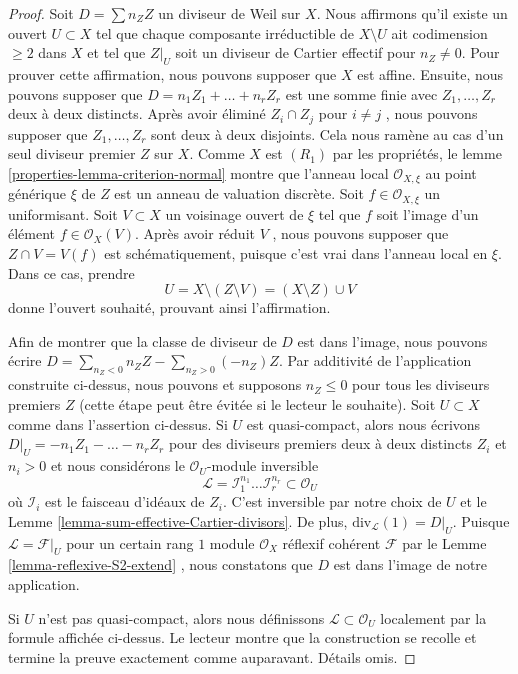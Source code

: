 \begin{proof}
\medskip\noindent
Soit  $D = \sum n_Z Z$  un diviseur de Weil sur  $X$. Nous affirmons qu'il
existe un ouvert  $U \subset X$  tel que chaque composante irréductible de
 $X \setminus U$  ait codimension  $\geq 2$  dans  $X$  et tel que
 $Z|_U$  soit un diviseur de Cartier effectif pour  $n_Z \not = 0$. Pour prouver
cette affirmation, nous pouvons supposer que  $X$  est affine. Ensuite,
nous pouvons supposer que  $D = n_1 Z_1 + \ldots + n_r Z_r$  est une somme finie avec  $Z_1, \ldots, Z_r$  deux
à deux distincts. Après avoir éliminé  $Z_i \cap Z_j$  pour  $i \not = j$ , nous pouvons
supposer que  $Z_1, \ldots, Z_r$  sont deux à deux disjoints. Cela nous ramène au cas d'un
seul diviseur premier  $Z$  sur  $X$. Comme  $X$  est
 $(R_1)$  par les propriétés, le lemme  \ref{properties-lemma-criterion-normal}  montre que l'anneau local
 $\mathcal{O}_{X, \xi}$  au point générique  $\xi$  de  $Z$  est un anneau de
valuation discrète. Soit  $f \in \mathcal{O}_{X, \xi}$  un uniformisant. Soit  $V \subset X$  un
voisinage ouvert de  $\xi$  tel que  $f$  soit l'image d'un élément
 $f \in \mathcal{O}_X(V)$. Après avoir réduit  $V$ , nous pouvons supposer que
 $Z \cap V = V(f)$  est schématiquement, puisque c'est vrai dans l'anneau local en
 $\xi$. Dans ce cas, prendre
$$
U = X \setminus (Z \setminus V) = (X \setminus Z) \cup V
$$
donne l'ouvert souhaité, prouvant ainsi l'affirmation.

\medskip\noindent
Afin de montrer que la classe de diviseur de  $D$  est dans l'image, nous
pouvons écrire  $D = \sum_{n_Z < 0} n_Z Z - \sum_{n_Z > 0} (-n_Z) Z$. Par additivité de l'application construite ci-dessus,
nous pouvons et supposons  $n_Z \leq 0$  pour tous les diviseurs premiers
 $Z$  (cette étape peut être évitée si le lecteur le souhaite). Soit
 $U \subset X$  comme dans l'assertion ci-dessus. Si  $U$  est quasi-compact,
alors nous écrivons  $D|_U = -n_1 Z_1 - \ldots - n_r Z_r$  pour des diviseurs premiers deux à deux distincts
 $Z_i$  et  $n_i > 0$  et nous considérons le  $\mathcal{O}_U$-module inversible
$$
\mathcal{L} =
\mathcal{I}_1^{n_1} \ldots \mathcal{I}_r^{n_r} \subset \mathcal{O}_U
$$
où  $\mathcal{I}_i$  est le faisceau d'idéaux de  $Z_i$. C'est inversible par
notre choix de  $U$  et le Lemme  \ref{lemma-sum-effective-Cartier-divisors}. De plus,  $\text{div}_\mathcal{L}(1) = D|_U$.
Puisque  $\mathcal{L} = \mathcal{F}|_U$  pour un certain rang  $1$  module  $\mathcal{O}_X$
réflexif cohérent  $\mathcal{F}$  par le Lemme  \ref{lemma-reflexive-S2-extend} , nous constatons que
 $D$  est dans l'image de notre application.

\medskip\noindent
Si  $U$  n'est pas quasi-compact, alors nous définissons  $\mathcal{L} \subset \mathcal{O}_U$ 
localement par la formule affichée ci-dessus. Le lecteur montre que la
construction se recolle et termine la preuve exactement comme auparavant. Détails
omis.
\end{proof}

